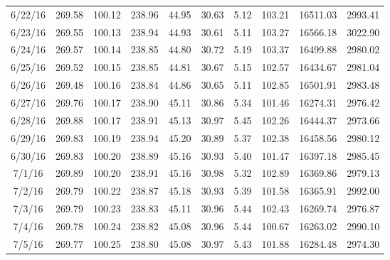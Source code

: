 \documentclass[12pt,a4paper]{report}
\begin{document}
\begin{longtable}[c]{| c | c | c |c |c |c |c |c |c |c |}
6/22/16       & 269.58       & 100.12       & 238.96      & 44.95           & 30.63        & 5.12         & 103.21       & 16511.03     & 2993.41      \\
6/23/16       & 269.55       & 100.13       & 238.94      & 44.93           & 30.61        & 5.11         & 103.27       & 16566.18     & 3022.90      \\
6/24/16       & 269.57       & 100.14       & 238.85      & 44.80           & 30.72        & 5.19         & 103.37       & 16499.88     & 2980.02      \\
6/25/16       & 269.52       & 100.15       & 238.85      & 44.81           & 30.67        & 5.15         & 102.57       & 16434.67     & 2981.04      \\
6/26/16       & 269.48       & 100.16       & 238.84      & 44.86           & 30.65        & 5.11         & 102.85       & 16501.91     & 2983.48      \\
6/27/16       & 269.76       & 100.17       & 238.90      & 45.11           & 30.86        & 5.34         & 101.46       & 16274.31     & 2976.42      \\
6/28/16       & 269.88       & 100.17       & 238.91      & 45.13           & 30.97        & 5.45         & 102.26       & 16444.37     & 2973.66      \\
6/29/16       & 269.83       & 100.19       & 238.94      & 45.20           & 30.89        & 5.37         & 102.38       & 16458.56     & 2980.12      \\
6/30/16       & 269.83       & 100.20       & 238.89      & 45.16           & 30.93        & 5.40         & 101.47       & 16397.18     & 2985.45      \\
7/1/16        & 269.89       & 100.20       & 238.91      & 45.16           & 30.98        & 5.32         & 102.89       & 16369.86     & 2979.13      \\
7/2/16        & 269.79       & 100.22       & 238.87      & 45.18           & 30.93        & 5.39         & 101.58       & 16365.91     & 2992.00      \\
7/3/16        & 269.79       & 100.23       & 238.83      & 45.11           & 30.96        & 5.44         & 102.43       & 16269.74     & 2976.87      \\
7/4/16        & 269.78       & 100.24       & 238.82      & 45.08           & 30.96        & 5.44         & 100.67       & 16263.02     & 2990.10      \\
7/5/16        & 269.77       & 100.25       & 238.80      & 45.08           & 30.97        & 5.43         & 101.88       & 16284.48     & 2974.30      \\

\end{longtable}
\end{document}
